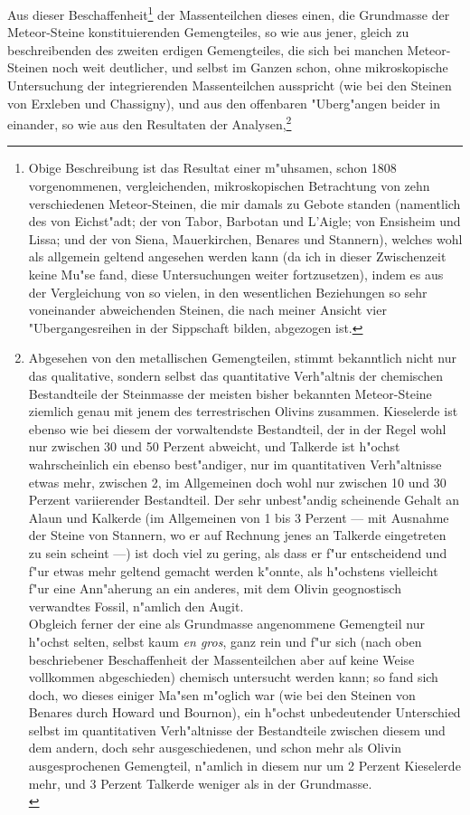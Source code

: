 \documentclass[a4paper, 11pt, oneside, german]{article}
\begin{document}
Aus dieser Beschaffenheit\footnote{Obige Beschreibung ist das Resultat einer m"uhsamen, schon 1808 vorgenommenen, vergleichenden, mikroskopischen Betrachtung von zehn verschiedenen Meteor-Steinen, die mir damals zu Gebote standen (namentlich des von Eichst"adt; der von Tabor, Barbotan und L'Aigle; von Ensisheim und Lissa; und der von Siena, Mauerkirchen, Benares und Stannern), welches wohl als allgemein geltend angesehen werden kann (da ich in dieser Zwischenzeit keine Mu"se fand, diese Untersuchungen weiter fortzusetzen), indem es aus der Vergleichung von so vielen, in den wesentlichen Beziehungen so sehr voneinander abweichenden Steinen, die nach meiner Ansicht vier "Ubergangesreihen in der Sippschaft bilden, abgezogen ist.} der Massenteilchen dieses einen, die Grundmasse der Meteor-Steine konstituierenden Gemengteiles, so wie aus jener, gleich zu beschreibenden des zweiten erdigen Gemengteiles, die sich bei manchen Meteor-Steinen noch weit deutlicher, und selbst im Ganzen schon, ohne mikroskopische Untersuchung der integrierenden Massenteilchen ausspricht (wie bei den Steinen von Erxleben und Chassigny), und aus den offenbaren "Uberg"angen beider in einander, so wie aus den Resultaten der Analysen,\footnote{Abgesehen von den metallischen Gemengteilen, stimmt bekanntlich nicht nur das qualitative, sondern selbst das quantitative Verh"altnis der chemischen Bestandteile der Steinmasse der meisten bisher bekannten Meteor-Steine ziemlich genau mit jenem des terrestrischen Olivins zusammen. Kieselerde ist ebenso wie bei diesem der vorwaltendste Bestandteil, der in der Regel wohl nur zwischen 30 und 50 Perzent abweicht, und Talkerde ist h"ochst wahrscheinlich ein ebenso best"andiger, nur im quantitativen Verh"altnisse etwas mehr, zwischen 2, im Allgemeinen doch wohl nur zwischen 10 und 30 Perzent variierender Bestandteil. Der sehr unbest"andig scheinende Gehalt an Alaun und Kalkerde (im Allgemeinen von 1 bis 3 Perzent --- mit Ausnahme der Steine von Stannern, wo er auf Rechnung jenes an Talkerde eingetreten zu sein scheint ---) ist doch viel zu gering, als dass er f"ur entscheidend und f"ur etwas mehr geltend gemacht werden k"onnte, als h"ochstens vielleicht f"ur eine Ann"aherung an ein anderes, mit dem Olivin geognostisch verwandtes Fossil, n"amlich den Augit.\\
Obgleich ferner der eine als Grundmasse angenommene Gemengteil nur h"ochst selten, selbst kaum \emph{en gros}, ganz rein und f"ur sich (nach oben beschriebener Beschaffenheit der Massenteilchen aber auf keine Weise vollkommen abgeschieden) chemisch untersucht werden kann; so fand sich doch, wo dieses einiger Ma"sen m"oglich war (wie bei den Steinen von Benares durch Howard und Bournon), ein h"ochst unbedeutender Unterschied selbst im quantitativen Verh"altnisse der Bestandteile zwischen diesem und dem andern, doch sehr ausgeschiedenen, und schon mehr als Olivin ausgesprochenen Gemengteil, n"amlich in diesem nur um 2 Perzent Kieselerde mehr, und 3 Perzent Talkerde weniger als in der Grundmasse.\\
}
\end{document}
